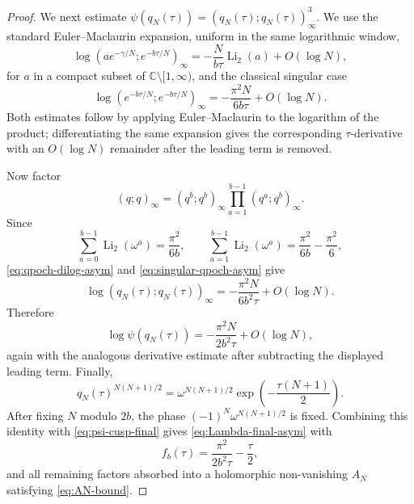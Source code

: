 \documentclass[10pt,a4paper]{amsart}
\newcommand{\C}{\mathbb C}
\newcommand{\qpoch}[2]{(#1;#2)_\infty}
\begin{document}
\begin{proof}
We next estimate $\psi(q_N(\tau))=\qpoch{q_N(\tau)}{q_N(\tau)}^3$.  We use the standard Euler--Maclaurin expansion, uniform in the same logarithmic window,
\begin{equation}\label{eq:qpoch-dilog-asym}
        \log\qpoch{a e^{-\gamma/N}}{e^{-b\tau/N}}
        =-\frac{N}{b\tau}\operatorname{Li}_2(a)+O(\log N),
\end{equation}
for $a$ in a compact subset of $\C\setminus[1,\infty)$, and the classical singular case
\begin{equation}\label{eq:singular-qpoch-asym}
        \log\qpoch{e^{-b\tau/N}}{e^{-b\tau/N}}
        =-\frac{\pi^2N}{6b\tau}+O(\log N).
\end{equation}
Both estimates follow by applying Euler--Maclaurin to the logarithm of the product; differentiating the same expansion gives the corresponding $\tau$-derivative with an $O(\log N)$ remainder after the leading term is removed.

Now factor
\[
        \qpoch{q}{q}=\qpoch{q^b}{q^b}
        \prod_{a=1}^{b-1}\qpoch{q^a}{q^b}.
\]
Since
\[
        \sum_{a=0}^{b-1}\operatorname{Li}_2(\omega^a)=\frac{\pi^2}{6b},
        \qquad
        \sum_{a=1}^{b-1}\operatorname{Li}_2(\omega^a)=\frac{\pi^2}{6b}-\frac{\pi^2}{6},
\]
\eqref{eq:qpoch-dilog-asym} and \eqref{eq:singular-qpoch-asym} give
\[
        \log\qpoch{q_N(\tau)}{q_N(\tau)}
        =-\frac{\pi^2N}{6b^2\tau}+O(\log N).
\]
Therefore
\begin{equation}\label{eq:psi-cusp-final}
        \log\psi(q_N(\tau))
        =-\frac{\pi^2N}{2b^2\tau}+O(\log N),
\end{equation}
again with the analogous derivative estimate after subtracting the displayed leading term.
Finally,
\[
        q_N(\tau)^{N(N+1)/2}
        =\omega^{N(N+1)/2}\exp\left(-\frac{\tau(N+1)}2\right).
\]
After fixing $N$ modulo $2b$, the phase $(-1)^N\omega^{N(N+1)/2}$ is fixed.  Combining this identity with \eqref{eq:psi-cusp-final} gives \eqref{eq:Lambda-final-asym} with
\[
        f_b(\tau)=\frac{\pi^2}{2b^2\tau}-\frac{\tau}{2},
\]
and all remaining factors absorbed into a holomorphic non-vanishing $A_N$ satisfying \eqref{eq:AN-bound}.
\end{proof}
\end{document}
